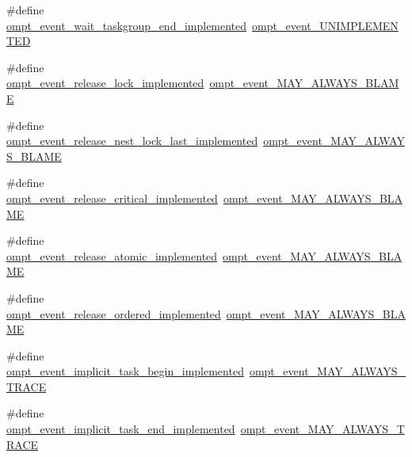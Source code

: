 \begin{DoxyCompactItemize}
\item 
\#define \hyperlink{ompt-event-specific_8h_a9e8481cddc28288f581829742f759a40}{ompt\-\_\-event\-\_\-wait\-\_\-taskgroup\-\_\-end\-\_\-implemented}~\hyperlink{ompt-event-specific_8h_a5719430a79b410eee8d68fcec0fbf8f2}{ompt\-\_\-event\-\_\-\-U\-N\-I\-M\-P\-L\-E\-M\-E\-N\-T\-E\-D}
\item 
\#define \hyperlink{ompt-event-specific_8h_a50047f862997bd4bbfd25becd8289fb5}{ompt\-\_\-event\-\_\-release\-\_\-lock\-\_\-implemented}~\hyperlink{ompt-event-specific_8h_a7014420b707fad74a0e4a1f14d46067d}{ompt\-\_\-event\-\_\-\-M\-A\-Y\-\_\-\-A\-L\-W\-A\-Y\-S\-\_\-\-B\-L\-A\-M\-E}
\item 
\#define \hyperlink{ompt-event-specific_8h_ac3d7eb46e01e54281e1b65ebbb0ab214}{ompt\-\_\-event\-\_\-release\-\_\-nest\-\_\-lock\-\_\-last\-\_\-implemented}~\hyperlink{ompt-event-specific_8h_a7014420b707fad74a0e4a1f14d46067d}{ompt\-\_\-event\-\_\-\-M\-A\-Y\-\_\-\-A\-L\-W\-A\-Y\-S\-\_\-\-B\-L\-A\-M\-E}
\item 
\#define \hyperlink{ompt-event-specific_8h_a2a9b781af42739c3fd42a0a3f6057ce9}{ompt\-\_\-event\-\_\-release\-\_\-critical\-\_\-implemented}~\hyperlink{ompt-event-specific_8h_a7014420b707fad74a0e4a1f14d46067d}{ompt\-\_\-event\-\_\-\-M\-A\-Y\-\_\-\-A\-L\-W\-A\-Y\-S\-\_\-\-B\-L\-A\-M\-E}
\item 
\#define \hyperlink{ompt-event-specific_8h_a09f06c17ab3c3d83be293afd77c59107}{ompt\-\_\-event\-\_\-release\-\_\-atomic\-\_\-implemented}~\hyperlink{ompt-event-specific_8h_a7014420b707fad74a0e4a1f14d46067d}{ompt\-\_\-event\-\_\-\-M\-A\-Y\-\_\-\-A\-L\-W\-A\-Y\-S\-\_\-\-B\-L\-A\-M\-E}
\item 
\#define \hyperlink{ompt-event-specific_8h_aef13f68ababea41e315591dca6cdb230}{ompt\-\_\-event\-\_\-release\-\_\-ordered\-\_\-implemented}~\hyperlink{ompt-event-specific_8h_a7014420b707fad74a0e4a1f14d46067d}{ompt\-\_\-event\-\_\-\-M\-A\-Y\-\_\-\-A\-L\-W\-A\-Y\-S\-\_\-\-B\-L\-A\-M\-E}
\item 
\#define \hyperlink{ompt-event-specific_8h_a07d69345c7f13010aafcbd3dcbc4062d}{ompt\-\_\-event\-\_\-implicit\-\_\-task\-\_\-begin\-\_\-implemented}~\hyperlink{ompt-event-specific_8h_a81d63d53ff090774864cdd033effe56e}{ompt\-\_\-event\-\_\-\-M\-A\-Y\-\_\-\-A\-L\-W\-A\-Y\-S\-\_\-\-T\-R\-A\-C\-E}
\item 
\#define \hyperlink{ompt-event-specific_8h_acefc74b81d1b94f2e43292b62d627c5e}{ompt\-\_\-event\-\_\-implicit\-\_\-task\-\_\-end\-\_\-implemented}~\hyperlink{ompt-event-specific_8h_a81d63d53ff090774864cdd033effe56e}{ompt\-\_\-event\-\_\-\-M\-A\-Y\-\_\-\-A\-L\-W\-A\-Y\-S\-\_\-\-T\-R\-A\-C\-E}

\end{DoxyCompactItemize}
